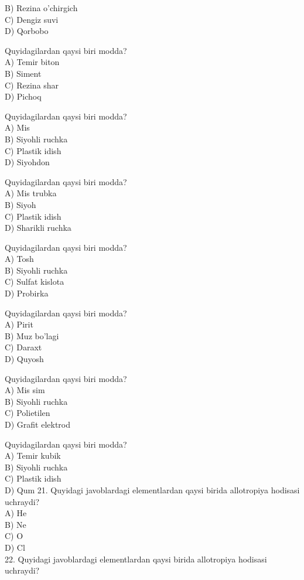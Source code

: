 B) Rezina o'chirgich\\
C) Dengiz suvi\\
D) Qorbobo
  \item Quyidagilardan qaysi biri modda?\\
A) Temir biton\\
B) Siment\\
C) Rezina shar\\
D) Pichoq
  \item Quyidagilardan qaysi biri modda?\\
A) Mis\\
B) Siyohli ruchka\\
C) Plastik idish\\
D) Siyohdon
  \item Quyidagilardan qaysi biri modda?\\
A) Mis trubka\\
B) Siyoh\\
C) Plastik idish\\
D) Sharikli ruchka
  \item Quyidagilardan qaysi biri modda?\\
A) Tosh\\
B) Siyohli ruchka\\
C) Sulfat kislota\\
D) Probirka
  \item Quyidagilardan qaysi biri modda?\\
A) Pirit\\
B) Muz bo'lagi\\
C) Daraxt\\
D) Quyosh
  \item Quyidagilardan qaysi biri modda?\\
A) Mis sim\\
B) Siyohli ruchka\\
C) Polietilen\\
D) Grafit elektrod
  \item Quyidagilardan qaysi biri modda?\\
A) Temir kubik\\
B) Siyohli ruchka\\
C) Plastik idish\\
D) Qum
21. Quyidagi javoblardagi elementlardan qaysi birida allotropiya hodisasi uchraydi?\\
A) He\\
B) Ne\\
C) O\\
D) Cl\\
22. Quyidagi javoblardagi elementlardan qaysi birida allotropiya hodisasi uchraydi?\\
